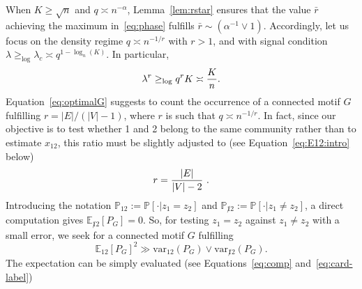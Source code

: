 \documentclass[final]{colt2026}
\newcommand{\1}{\mathbf{1}}
\newcommand{\bbE}{\mathbb{E}}
\newcommand{\bbP}{\mathbb{P}}
\newcommand{\cro}[1]{\left[#1\right]}
\begin{document}
When $K\geq \sqrt{n}$ and $q\asymp n^{-\alpha}$,  Lemma~\ref{lem:rstar}  ensures that
 the value $\bar r$ achieving the maximum in~\eqref{eq:phase} fulfills $\bar r\sim (\alpha^{-1}\vee 1)$. 
Accordingly,
let us focus on the density regime $q\asymp n^{-1/r}$ with $r> 1$, and with signal condition $\lambda \geq_{\log} \lambda_{c}\asymp q^{1-\log_{n}(K)}$. In particular, 
\begin{equation}\label{eq:cond:lambda/q}
\lambda^r\geq_{\log} q^r K\asymp {K\over n}.
\end{equation}
Equation~\eqref{eq:optimalG} suggests to count the occurrence of a connected motif $G$ fulfilling 
$r=|E|/(|V|-1)$, where $r$ is such that $q\asymp n^{-1/r}$. In fact, since our objective is to test whether 1 and 2 belong to the same community rather than to estimate $x_{12}$, this ratio must be slightly adjusted to (see Equation~\eqref{eq:E12:intro} below)
\begin{equation}\label{def:r}
r={|E|\over |V|-2}\ .
\end{equation}
Introducing the notation $\bbP_{12}:=\bbP\cro{\cdot|z_{1}=z_{2}}$ and $\bbP_{\not 12}:=\bbP\cro{\cdot|z_{1}\neq z_{2}}$,
a direct computation gives $\bbE_{\not 12}\cro{P_{G}}=0$. So,
for testing  $z_{1}=z_{2}$ against $z_{1}\neq z_{2}$ with a small error, we seek for a connected motif $G$ fulfilling
\begin{equation}\label{eq:test:success}
\bbE_{12}\cro{P_{G}}^2 \gg  \mathrm{var}_{12}(P_{G}) \vee  \mathrm{var}_{\not 12}(P_{G}).
\end{equation}
The expectation can be simply evaluated (see Equations~\eqref{eq:comp} and~\eqref{eq:card-label})
\end{document}
